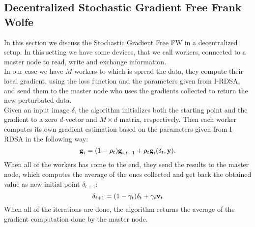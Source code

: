 \subsection{Decentralized Stochastic Gradient Free Frank Wolfe}
In this section we discuss the Stochastic Gradient Free FW in a decentralized setup. In this setting we have some devices, that we call workers, connected to a master node to read, write and exchange information.\\
In our case we have $M$ workers to which is spread the data, they compute their local gradient, using the loss function and the parameters given from I-RDSA, and send them to the master node who uses the gradients collected to return the new perturbated data.\\
Given an input image \boldmath$\delta$, the algorithm initializes both the starting point and the gradient to a zero $d$-vector and $M \times d$ matrix, respectively. Then each worker computes its own gradient estimation based on the parameters given from I-RDSA in the following way:
\[\textbf{g}_i= (1- \rho_t)\textbf{g}_{i,t-1} + \rho_t\textbf{g}_i(\text{\boldmath}\delta_t,\textbf{y}).\]
 When all of the workers has come to the end, they send the results to the master node, which computes the average of the ones collected and get back the obtained value as new initial point \boldmath$\delta_{t+1}$:
\[\text{\boldmath}\delta_{t+1} = (1-\gamma_t)\text{\boldmath}\delta_t + \gamma_t\textbf{v}_t \]
 When all of the iterations are done, the algorithm returns the average of the gradient computation done by the master node.

